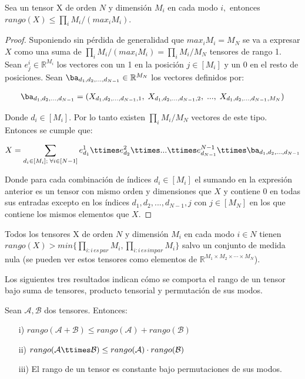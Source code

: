 \begin{lema}
Sea un tensor X de orden $N$ y dimensión $M_i$ en cada modo $i,$ entonces $rango(X) \le \prod_i M_i/(max_i M_i)$. 
\end{lema}
\begin{proof}
Suponiendo sin pérdida de generalidad que $max_i M_i = M_N$ se va a expresar $X$ como una suma de $\prod_i M_i/(max_i M_i) = \prod_i M_i/M_N$ tensores de rango 1. Sean $e^i_j\in\mathbb{R}^{M_i}$ los vectores con un 1 en la posición $j\in [M_i]$ y un $0$ en el resto de posiciones. Sean $\ba_{d_1,d_2,...,d_{N-1}}\in\mathbb{R}^{M_N}$ los vectores definidos por:

\begin{align*}
\ba_{d_1,d_2,...,d_{N-1}} = (X_{d_1,d_2,...,d_{N-1},1},\;  X_{d_1,d_2,...,d_{N-1},2}, \; ..., \; X_{d_1,d_2,...,d_{N-1},M_N})
\end{align*}

Donde $d_i \in [M_i]$. Por lo tanto existen $\prod_i M_i/M_N$ vectores de este tipo. Entonces se cumple que:


\begin{align*}
X = \sum_{d_i \in [M_i] ; \; \forall i \in [N-1]} e_{d_1}^1 \ttimes e_{d_2}^2 \ttimes ... \ttimes e_{d_{N-1}}^{N-1} \ttimes \ba_{d_1,d_2,...,d_{N-1}}
\end{align*}

Donde para cada combinación de índices $d_i\in[M_i]$ el sumando en la expresión anterior es un tensor con mismo orden y dimensiones que $X$ y contiene $0$ en todas sus entradas excepto en los índices $d_1,d_2,...,d_{N-1},j$ con $j\in [M_N]$ en los que contiene los mismos elementos que $X$.

\end{proof}

\begin{lema}
Todos los tensores X de orden $N$ y dimensión $M_i$ en cada modo $i\in N$ tienen $rango(X) > min\{\prod_{i:i\,es\,par}M_i,\prod_{i:i\,es\,impar}M_i\}$ salvo un conjunto de medida nula (se pueden ver estos tensores como elementos de $\mathbb{R}^{M_1\times M_2 \times \cdots  \times M_N}$).
\end{lema}

Los siguientes tres resultados indican cómo se comporta el rango de un tensor bajo suma de tensores, producto tensorial y permutación de sus modos.

\begin{lema}
Sean $\mathcal{A},\mathcal{B}$ dos tensores. Entonces:
\begin{itemize}
\item[i)] $rango(\mathcal{A}+\mathcal{B})\leq rango(\mathcal{A})+rango(\mathcal{B})$
\item[ii)] $rango(\mathcal{A}\ttimes\mathcal{B})\leq rango(\mathcal{A})\cdot rango(\mathcal{B})$
\item[iii)] El rango de un tensor es constante bajo permutaciones de sus modos.
\end{itemize}
\end{lema}


